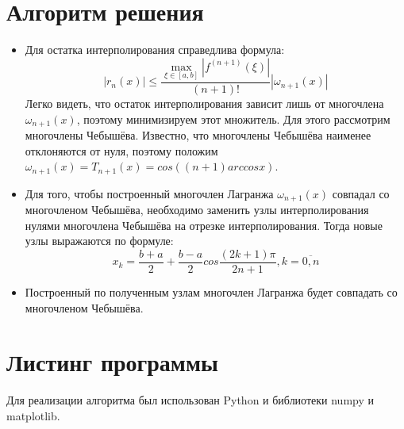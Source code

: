 \documentclass[14pt, a4paper]{article}
\begin{document}
  \section{Алгоритм решения}
  \begin{itemize}
     \item 
     Для остатка интерполирования справедлива формула: $$|r_n(x)| \leq \frac{\max\limits_{\xi \in [a, b]} |f^{(n+1)}(\xi)|}{(n+1)!}|\omega_{n+1}(x)|$$
     Легко видеть, что остаток интерполирования зависит лишь от многочлена $\omega_{n+1}(x)$, поэтому минимизируем этот множитель. Для этого рассмотрим многочлены Чебышёва. Известно, что многочлены Чебышёва наименее отклоняются от нуля, поэтому положим $\omega_{n+1}(x) = T_{n+1}(x) = cos((n+1)arccosx)$.
     \item
     Для того, чтобы построенный многочлен Лагранжа $\omega_{n+1}(x)$ совпадал со многочленом Чебышёва, необходимо заменить узлы интерполирования нулями многочлена Чебышёва на отрезке интерполирования. Тогда новые узлы выражаются по формуле: \begin{equation}x_k = \frac{b+a}{2} + \frac{b-a}{2}cos\frac{(2k+1)\pi}{2n+1}, k=\overline{0, n}\end{equation}
     \item
     Построенный по полученным узлам многочлен Лагранжа будет совпадать со многочленом Чебышёва.
  \end{itemize}
  \section{Листинг программы}
  Для реализации алгоритма был использован Python и библиотеки numpy и matplotlib.
\end{document}
